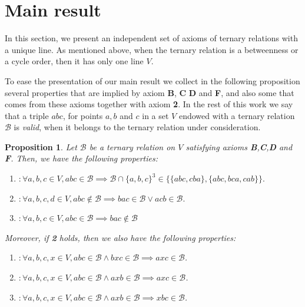 \documentclass{article}
\newtheorem{proposition}[definition]{Proposition}
\newcommand{\calb}{\mathcal{B}}
\begin{document}
\section{Main result}

In this section, we present an independent set of axioms of ternary relations with a unique line. As mentioned above, when the ternary relation is a betweenness or a cycle order, then it has only one line $V$. 


To ease the presentation of our main result we collect in the following proposition several properties that are implied by axiom \textbf{B}, \textbf{C} \textbf{D} and \textbf{F}, and also some that comes from these axioms together with axiom \textbf{2}. 
In the rest of this work we say that a triple $abc$, for points $a,b$ and $c$ in a set $V$ endowed with a ternary relation $\calb$ is \emph{valid}, when it belongs to the ternary relation under consideration. 

\begin{proposition}
\label{p:tools}
	Let $\calb$ be a ternary relation on $V$ satisfying axioms \textbf{B},\textbf{C},\textbf{D} and \textbf{F}. Then, we have the following properties:
    
	\begin{enumerate}
		\item[\textbf{L}\,] $: \forall a,b,c \in V, abc\in\calb\implies \calb\cap \{a,b,c\}^3\in \{ \{abc,cba\}, \{abc,bca,cab\} \}.$ 
        
		\item[\textbf{G}\,]$: \forall a,b,c,d \in V, abc\notin\calb\implies bac \in\calb\lor acb\in\calb.$
	        
	    \item[\textbf{C'}]$: \forall a,b,c \in V, abc\in\calb\implies bac\notin\calb$
	\end{enumerate}
	
	Moreover, if \textbf{2} holds, then we also have the following properties:
    
	\begin{enumerate}
		\item[\textbf{3}\ ]$: \forall a,b,c,x \in V, abc\in\calb\land bxc \in\calb\implies axc\in\calb$.
	    \item[\textbf{2'}]$: \forall a,b,c,x \in V, abc\in\calb\land axb \in\calb\implies axc\in\calb$.
	    \item[\textbf{3'}]$: \forall a,b,c,x \in V, abc\in\calb\land axb \in\calb\implies xbc\in\calb$.
            
            
	\end{enumerate}
\end{proposition}
\end{document}
